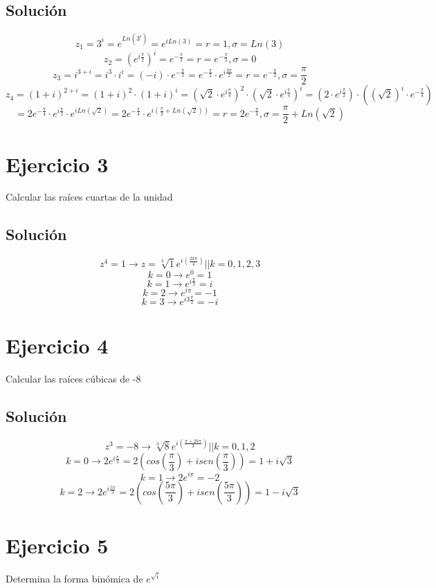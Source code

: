 \documentclass[fleqn]{article}
\begin{document}
	\subsection{Solución}
	\[
	z_1 = 3^{i} = e^{Ln(3^{i})} = e^{i Ln(3)} = \boxed{r=1 , \sigma = Ln (3)}
	\]
	\[
	z_2 = (e^{i\frac{\pi}{2}})^{i} = e^{-\frac{\pi}{2}} = \boxed{r=e^{-\frac{\pi}{2}}, \sigma = 0}
	\]
	\[
	z_3 = i^{3+i} = i^{3} \cdot i^{i} = (-i) \cdot e^{-\frac{\pi}{2}} = e^{-\frac{\pi}{2}} \cdot e^{i\frac{3\pi}{2}} = \boxed{r=e^{-\frac{\pi}{2}}, \sigma = \frac{\pi}{2}}
	\]
	\[
	z_4 = (1+i)^{2+i} = (1+i)^{2} \cdot (1+i)^{i} = (\sqrt{2} \cdot e^{i\frac{\pi}{4}})^{2} \cdot (\sqrt{2} \cdot e^{i\frac{\pi}{4}})^{i} = (2 \cdot e^{i\frac{\pi}{2}}) \cdot ((\sqrt{2})^{i} \cdot e^{-\frac{\pi}{4}})
	\]
	\[
	= 2e^{-\frac{\pi}{4}} \cdot e^{i\frac{\pi}{2}} \cdot e^{iLn(\sqrt{2})} = 2e^{-\frac{\pi}{4}} \cdot e^{i(\frac{\pi}{2} + Ln(\sqrt{2}))} = \boxed{r=2e^{-\frac{\pi}{4}}, \sigma = \frac{\pi}{2} + Ln(\sqrt{2})}
	\]
	\section{Ejercicio 3}
	Calcular las raíces cuartas de la unidad
	\subsection{Solución}
	\[
	z^{4} = 1 \rightarrow z = \sqrt[4]{1} e^{i(\frac{2k\pi}{4})} || k = 0,1,2,3
	\]
	\[
	k = 0 \rightarrow e^{0} = \boxed{1}
	\]
	\[
	k = 1 \rightarrow e^{i\frac{\pi}{2}} = \boxed{i}
	\]
	\[
	k = 2 \rightarrow e^{i\pi} = \boxed{-1}
	\]
	\[
	k = 3 \rightarrow e^{i3\frac{\pi}{2}} = \boxed{-i}
	\]
	\section{Ejercicio 4}
	Calcular las raíces cúbicas de -8
	\subsection{Solución}
	\[
	z^{3} = -8 \rightarrow \sqrt[3]{8} e^{i(\frac{\pi + 2k\pi}{3})} || k = 0,1,2
	\]
	\[
	k = 0 \rightarrow 2e^{i\frac{\pi}{3}} = 2(cos(\frac{\pi}{3}) + isen(\frac{\pi}{3})) = \boxed{1 + i\sqrt{3}} 
	\]
	\[
	k = 1 \rightarrow 2e^{i\pi} = \boxed{-2}
	\]
	\[
	k = 2 \rightarrow 2e^{i\frac{5\pi}{3}} = 2(cos(\frac{5\pi}{3}) + isen(\frac{5\pi}{3})) = \boxed{1 - i\sqrt{3}}
	\]
	\section{Ejercicio 5}
	Determina la forma binómica de $e^{\sqrt{i}}$
\end{document}

